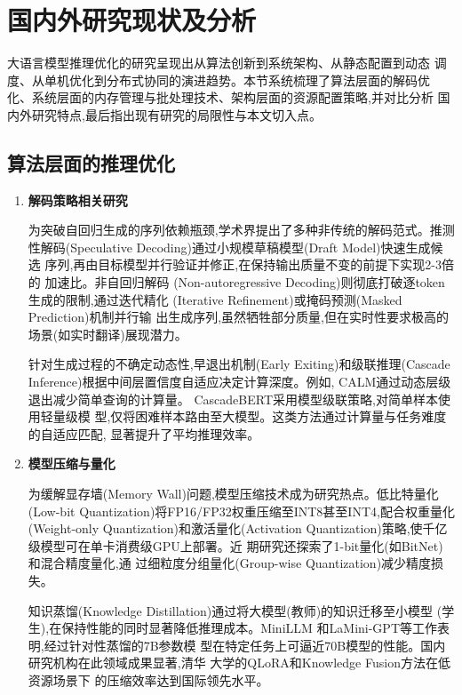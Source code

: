 \section{国内外研究现状及分析}

大语言模型推理优化的研究呈现出从算法创新到系统架构、从静态配置到动态
调度、从单机优化到分布式协同的演进趋势。本节系统梳理了算法层面的解码优
化、系统层面的内存管理与批处理技术、架构层面的资源配置策略,并对比分析
国内外研究特点,最后指出现有研究的局限性与本文切入点。

\subsection{算法层面的推理优化}

\begin{enumerate}

\item \textbf{解码策略相关研究}

为突破自回归生成的序列依赖瓶颈,学术界提出了多种非传统的解码范式。推测
性解码(Speculative Decoding)通过小规模草稿模型(Draft Model)快速生成候选
序列,再由目标模型并行验证并修正,在保持输出质量不变的前提下实现2-3倍的
加速比\cite{leviathan2023fast,chen2023accelerating}。非自回归解码
(Non-autoregressive Decoding)则彻底打破逐token生成的限制,通过迭代精化
(Iterative Refinement)\cite{Orca}或掩码预测(Masked Prediction)机制并行输
出生成序列,虽然牺牲部分质量,但在实时性要求极高的场景(如实时翻译)展现潜力。

针对生成过程的不确定动态性,早退出机制(Early Exiting)和级联推理(Cascade
Inference)根据中间层置信度自适应决定计算深度。例如,
CALM\cite{schuster2022confident}通过动态层级退出减少简单查询的计算量。
CascadeBERT\cite{li2021cascadebert}采用模型级联策略,对简单样本使用轻量级模
型,仅将困难样本路由至大模型。这类方法通过计算量与任务难度的自适应匹配,
显著提升了平均推理效率。

\item \textbf{模型压缩与量化}

为缓解显存墙(Memory Wall)问题,模型压缩技术成为研究热点。低比特量化
(Low-bit Quantization)将FP16/FP32权重压缩至INT8甚至INT4,配合权重量化
(Weight-only Quantization)和激活量化(Activation Quantization)策略,使千亿
级模型可在单卡消费级GPU上部署\cite{dettmers2022llm,frantar2022gptq}。近
期研究还探索了1-bit量化(如BitNet\cite{wang2023bitnet})和混合精度量化,通
过细粒度分组量化(Group-wise Quantization)减少精度损失。

知识蒸馏(Knowledge Distillation)通过将大模型(教师)的知识迁移至小模型
(学生),在保持性能的同时显著降低推理成本。MiniLLM\cite{gu2023knowledge}
和LaMini-GPT\cite{wu2023laminigpt}等工作表明,经过针对性蒸馏的7B参数模
型在特定任务上可逼近70B模型的性能。国内研究机构在此领域成果显著,清华
大学的QLoRA\cite{dettmers2023qlora}和Knowledge Fusion方法在低资源场景下
的压缩效率达到国际领先水平。

\end{enumerate}

